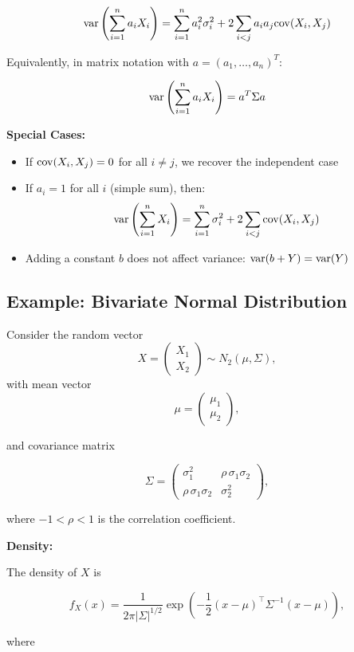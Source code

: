 \[
    \mathrm{var}\left(\sum_{i=1}^{n} a_i X_i\right) = \sum_{i=1}^{n} a_i^2 \sigma_i^2 + 2\sum_{i<j} a_i a_j \mathrm{cov}(X_i, X_j)
\]

Equivalently, in matrix notation with \(a = (a_1, \dots, a_n)^T\):

\[
    \mathrm{var}\left(\sum_{i=1}^{n} a_i X_i\right) = a^T \Sigma a
\]

\textbf{Special Cases:}

\begin{itemize}
    \item If \(\mathrm{cov}(X_i, X_j) = 0\) for all \(i \ne j\), we recover the independent case
    \item If \(a_i = 1\) for all \(i\) (simple sum), then:
    \[
        \mathrm{var}\left(\sum_{i=1}^{n} X_i\right) = \sum_{i=1}^{n} \sigma_i^2 + 2\sum_{i<j} \mathrm{cov}(X_i, X_j)
    \]
    \item Adding a constant \(b\) does not affect variance: \(\mathrm{var}(b + Y) = \mathrm{var}(Y)\)
\end{itemize}

\subsection{Example: Bivariate Normal Distribution}

Consider the random vector
\[
    X =
    \begin{pmatrix}
    X_1\\
    X_2
    \end{pmatrix}
    \sim
    N_2(\mu, \Sigma),
\]
with mean vector
\[
    \mu =
    \begin{pmatrix}
    \mu_1\\
    \mu_2
    \end{pmatrix},
\]

and covariance matrix

\[
    \Sigma =
    \begin{pmatrix}
    \sigma_1^2 & \rho\, \sigma_1 \sigma_2 \\[4pt]
    \rho\, \sigma_1 \sigma_2 & \sigma_2^2
    \end{pmatrix},
\]

where \(-1 < \rho < 1\) is the correlation coefficient.

\textbf{Density:}

The density of \(X\) is

\[
    f_X(x) =
    \frac{1}{2\pi |\Sigma|^{1/2}}
    \exp\!\left(
    -\frac{1}{2}(x-\mu)^{\top}\Sigma^{-1}(x-\mu)
    \right),
\]

where

